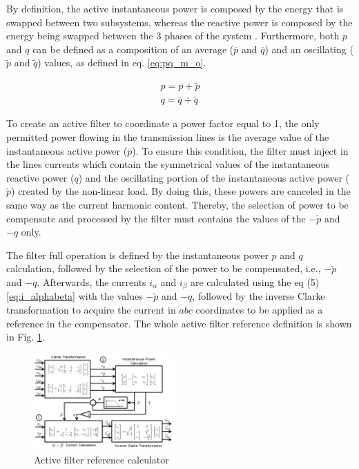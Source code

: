By definition, the active instantaneous power is composed by the energy that is swapped between two subsystems, whereas the reactive power is composed by the energy being swapped between the 3 phases of the system \cite{Akagi1984,Peng1996}. Furthermore, both $p$ and $q$ can be defined as a composition of an average ($\overline{p}$ and $\overline{q}$) and an oscillating ($\tilde{p}$ and $\tilde{q}$) values, as defined in eq. \ref{eq:pq_m_o}.

\begin{equation}
\begin{aligned}
p = \overline{p} + \tilde{p}\\
q = \overline{q} + \tilde{q} 
\end{aligned}
\label{eq:pq_m_o}
\end{equation} 

To create an active filter to coordinate a power factor equal to 1, the only permitted power flowing in the transmission lines is the average value of the instantaneous active power ($\overline{p}$). To ensure this condition, the filter must inject in the lines currents which contain the symmetrical values of the instantaneous reactive power ($q$) and the oscillating portion of the instantaneous active power ($\tilde{p}$) created by the non-linear load. By doing this, these powers are canceled in the same way as the current harmonic content. Thereby, the selection of power to be compensate and processed by the filter must contains the values of the $-\tilde{p}$ and $-q$ only.

The filter full operation is defined by the instantaneous power $p$ and $q$ calculation, followed by the selection of the power to be compensated, i.e., $-\tilde{p}$ and $-q$. Afterwards, the currents $i_{\alpha}$ and $i_{\beta}$ are calculated using the eq (5) \ref{eq:i_alphabeta} with the values $-\tilde{p}$ and $-q$, followed by the inverse Clarke transformation to acquire the current in $abc$ coordinates to be applied as a reference in the compensator. The whole active filter reference definition is shown in Fig. \ref{fig:diagrama_filtro.png}.


\begin{figure}[!th]
	\centering
	\includegraphics[width=0.48\textwidth]{Figures/diagrama_filtro.png}
	\caption{Active filter reference calculator}
	\label{fig:diagrama_filtro.png}
\end{figure}

